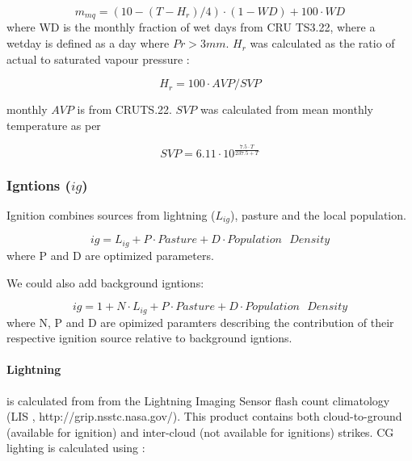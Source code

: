 \begin{equation}
     m_{mq}=
        (10 - (T - H_r) / 4) \cdot (1 - WD)
        + 100 \cdot WD
\end{equation}
where WD is the monthly fraction of wet days from CRU TS3.22, where a wetday is defined as a day where $Pr > 3mm$. $H_r$ was calculated as the ratio of actual to saturated vapour pressure :

\begin{equation}
    H_r = 100 \cdot AVP / SVP
\end{equation}

monthly $AVP$ is from CRUTS.22. $SVP$ was calculated from mean monthly temperature as per \citet{walter2000asce}

\begin{equation}
    SVP = 6.11 \cdot 10^{\frac{7.5 \cdot T}{237.5 + T}}
\end{equation}

\subsubsection{Igntions ($ig$)}

Ignition combines sources from lightning ($L_{ig}$), pasture and the local population.

\begin{equation}
    ig = L_{ig} + P \cdot Pasture + D \cdot Population\text{ }Density
\end{equation}
where P and D are optimized parameters.

\begin{shaded}
    We could also add background igntions:

    \begin{equation}
        ig = 1 + N \cdot L_{ig} + P \cdot Pasture + D \cdot Population\text{ }Density
    \end{equation}
    where N, P and D are opimized paramters describing the contribution of their respective ignition source relative to background igntions.
\end{shaded}

\paragraph{Lightning}
is calculated from
from the Lightning Imaging Sensor flash count climatology (LIS \cite{christian1999lightning}, http://grip.nsstc.nasa.gov/). 
This product contains both cloud-to-ground (available for ignition) and inter-cloud (not available for ignitions) strikes.
CG lighting is calculated using \citet{kelley2014improved}:

